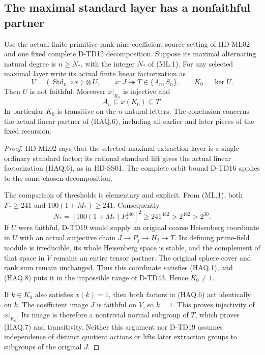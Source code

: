 \subsection*{The maximal standard layer has a nonfaithful partner}

\begin{corollary}
Use the actual finite primitive rank-nine coefficient-source setting
of HD-ML02 and one fixed complete D-TD12 decomposition. Suppose
its maximal alternating natural degree is $n\ge N_*$, with the
integer $N_*$ of (ML.1). For any selected maximal layer write its
actual finite linear factorization as
\[
 V=(\operatorname{Std}_n\circ x)\otimes U,\qquad
 x:J\twoheadrightarrow T\in\{A_n,S_n\},\qquad
 K_0=\ker U.
 \tag{HAQ.6}
\]
Then $U$ is not faithful. Moreover $x|_{K_0}$ is injective and
\[
                    A_n\subseteq x(K_0)\subseteq T.
 \tag{HAQ.7}
\]
In particular $K_0$ is transitive on the $n$ natural letters.
The conclusion concerns the actual linear partner of (HAQ.6),
including all earlier and later pieces of the fixed recursion.
\end{corollary}

\begin{proof}
HD-ML02 says that the selected maximal extraction layer is a single
ordinary standard factor; its rational standard lift gives the actual
linear factorization (HAQ.6), as in HD-SS01. The complete orbit bound
D-TD16 applies to the same chosen decomposition.

The comparison of thresholds is elementary and explicit. From (ML.1),
both $F_*\ge241$ and $100(1+M_*)\ge241$. Consequently
\[
 N_*=[100(1+M_*)F_*^{240}]^2
       \ge241^{482}>2^{482}>2^{30}.
 \tag{HAQ.8}
\]
If $U$ were faithful, D-TD19 would supply an original coarse
Heisenberg coordinate in $U$ with an actual surjective chain
$J\to P_j\to H_j\to T$. Its defining prime-field module is
irreducible, its whole Heisenberg space is stable, and the complement
of that space in $V$ remains an entire tensor partner. The original
sphere cover and rank sum remain unchanged. Thus this coordinate
satisfies (HAQ.1), and (HAQ.8) puts it in the impossible range of
D-TD43. Hence $K_0\ne1$.

If $k\in K_0$ also satisfies $x(k)=1$, then both factors in
(HAQ.6) act identically on $k$. The coefficient image $J$ is
faithful on $V$, so $k=1$. This proves injectivity of $x|_{K_0}$.
Its image is therefore a nontrivial normal subgroup of $T$,
which proves (HAQ.7) and transitivity. Neither this argument nor
D-TD19 assumes independence of distinct quotient actions or lifts
later extraction groups to subgroups of the original $J$.
\end{proof}

